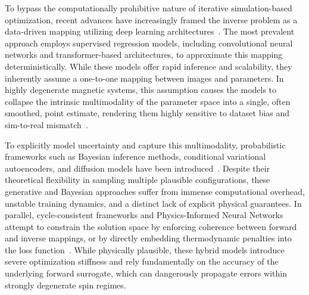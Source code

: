 \documentclass[final,5p,times,twocolumn]{elsarticle}
\begin{document}
To bypass the computationally prohibitive nature of iterative simulation-based optimization, recent advances have increasingly framed the inverse problem as a data-driven mapping utilizing deep learning architectures~\cite{lee2024deep}. The most prevalent approach employs supervised regression models, including convolutional neural networks and transformer-based architectures, to approximate this mapping deterministically. While these models offer rapid inference and scalability, they inherently assume a one-to-one mapping between images and parameters. In highly degenerate magnetic systems, this assumption causes the models to collapse the intrinsic multimodality of the parameter space into a single, often smoothed, point estimate, rendering them highly sensitive to dataset bias and sim-to-real mismatch~\cite{chen2024data}. 

To explicitly model uncertainty and capture this multimodality, probabilistic frameworks such as Bayesian inference methods, conditional variational autoencoders, and diffusion models have been introduced~\cite{lan2022scaling, liu2026bayesian, zhao2023generative, shmakov2023end}. Despite their theoretical flexibility in sampling multiple plausible configurations, these generative and Bayesian approaches suffer from immense computational overhead, unstable training dynamics, and a distinct lack of explicit physical guarantees. In parallel, cycle-consistent frameworks and Physics-Informed Neural Networks attempt to constrain the solution space by enforcing coherence between forward and inverse mappings, or by directly embedding thermodynamic penalties into the loss function~\cite{huang2023cycle, sui2026cyclemamba, baldan2023physics}. While physically plausible, these hybrid models introduce severe optimization stiffness and rely fundamentally on the accuracy of the underlying forward surrogate, which can dangerously propagate errors within strongly degenerate spin regimes.
\end{document}
